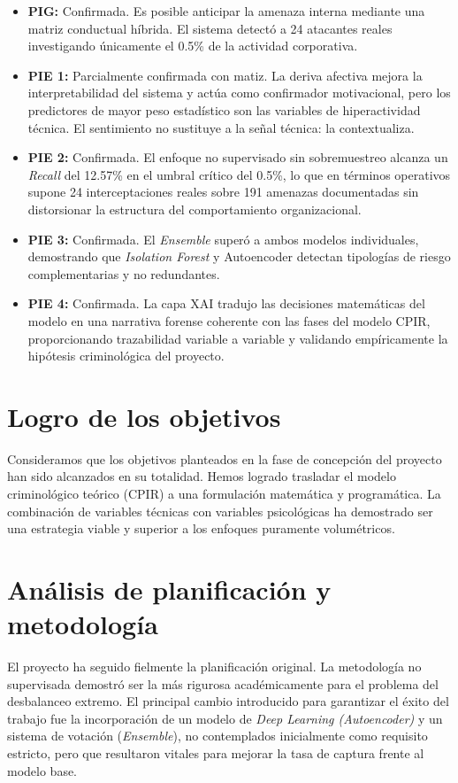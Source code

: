 \documentclass[IB]{TFUOC}%
\begin{document}
\begin{itemize}
    \item \textbf{PIG:} Confirmada. Es posible anticipar la amenaza interna 
    mediante una matriz conductual híbrida. El sistema detectó a 24 atacantes 
    reales investigando únicamente el 0.5\% de la actividad corporativa.
    
    \item \textbf{PIE 1:} Parcialmente confirmada con matiz. La deriva afectiva 
    mejora la interpretabilidad del sistema y actúa como confirmador 
    motivacional, pero los predictores de mayor peso estadístico son las 
    variables de hiperactividad técnica. El sentimiento no sustituye a la 
    señal técnica: la contextualiza.
    
    \item \textbf{PIE 2:} Confirmada. El enfoque no supervisado sin sobremuestreo 
    alcanza un \textit{Recall} del 12.57\% en el umbral crítico del 0.5\%, 
    lo que en términos operativos supone 24 interceptaciones reales sobre 
    191 amenazas documentadas sin distorsionar la estructura del comportamiento 
    organizacional.
    
    \item \textbf{PIE 3:} Confirmada. El \textit{Ensemble} superó a ambos 
    modelos individuales, demostrando que \textit{Isolation Forest} y 
    Autoencoder detectan tipologías de riesgo complementarias y no redundantes.
    
    \item \textbf{PIE 4:} Confirmada. La capa XAI tradujo las decisiones 
    matemáticas del modelo en una narrativa forense coherente con las fases 
    del modelo CPIR, proporcionando trazabilidad variable a variable y 
    validando empíricamente la hipótesis criminológica del proyecto.
\end{itemize}

\section{Logro de los objetivos}
Consideramos que los objetivos planteados en la fase de concepción del proyecto han sido alcanzados en su totalidad. Hemos logrado trasladar el modelo criminológico teórico (CPIR) a una formulación matemática y programática. La combinación de variables técnicas con variables psicológicas ha demostrado ser una estrategia viable y superior a los enfoques puramente volumétricos.

\section{Análisis de planificación y metodología}
El proyecto ha seguido fielmente la planificación original. La metodología no supervisada demostró ser la más rigurosa académicamente para el problema del desbalanceo extremo. El principal cambio introducido para garantizar el éxito del trabajo fue la incorporación de un modelo de \textit{Deep Learning (Autoencoder)} y un sistema de votación (\textit{Ensemble}), no contemplados inicialmente como requisito estricto, pero que resultaron vitales para mejorar la tasa de captura frente al modelo base.
\end{document}
